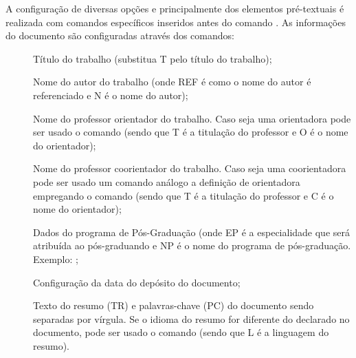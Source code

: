 A configuração de diversas opções e principalmente dos elementos pré-textuais é realizada com comandos específicos inseridos antes do comando . As informações do documento são configuradas através dos comandos:
\begin{description}

 \item[] Título do trabalho (substitua T pelo título do trabalho);

 \item[] Nome do autor do trabalho (onde REF é como o nome do autor é referenciado e N é o nome do autor);

 \item[] Nome do professor orientador do trabalho. Caso seja uma orientadora pode ser usado o comando  (sendo que T é a titulação do professor e O é o nome do orientador);

 \item[] Nome do professor coorientador do trabalho. Caso seja uma coorientadora pode ser usado um comando análogo a definição de orientadora  empregando o comando (sendo que T é a titulação do professor e C é o nome do orientador);

 
 \item[] Dados do programa de Pós-Graduação (onde EP é a especialidade que será atribuída ao pós-graduando e NP é o nome do programa de pós-graduação.  Exemplo: ;
 
 \item[] Configuração da data do depósito do documento;

 \item[] Texto do resumo (TR) e palavras-chave (PC) do documento sendo separadas por vírgula. Se o idioma do resumo for diferente do declarado no documento, pode ser usado o comando  (sendo que L é a linguagem do resumo).
 
\end{description}